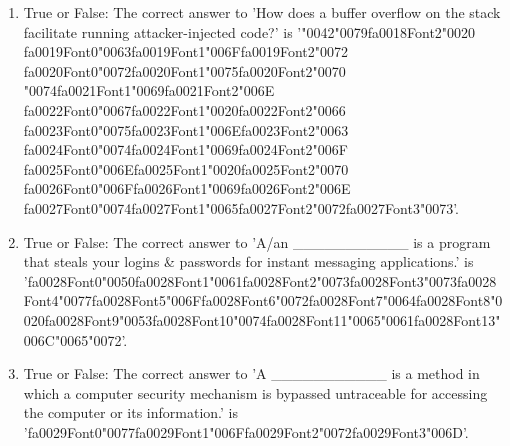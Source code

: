 \documentclass[12pt]{article}
\begin{document}
\begin{enumerate}[label=\arabic*.]
\item True or False: The correct answer to 'How does a buffer overflow on the stack facilitate running attacker-injected code?' is '{\char"0042}{\char"0079}{\csname fa0018Font2\endcsname\char"0020} {\csname fa0019Font0\endcsname\char"0063}{\csname fa0019Font1\endcsname\char"006F}{\csname fa0019Font2\endcsname\char"0072} {\csname fa0020Font0\endcsname\char"0072}{\csname fa0020Font1\endcsname\char"0075}{\csname fa0020Font2\endcsname\char"0070} {\char"0074}{\csname fa0021Font1\endcsname\char"0069}{\csname fa0021Font2\endcsname\char"006E} {\csname fa0022Font0\endcsname\char"0067}{\csname fa0022Font1\endcsname\char"0020}{\csname fa0022Font2\endcsname\char"0066} {\csname fa0023Font0\endcsname\char"0075}{\csname fa0023Font1\endcsname\char"006E}{\csname fa0023Font2\endcsname\char"0063} {\csname fa0024Font0\endcsname\char"0074}{\csname fa0024Font1\endcsname\char"0069}{\csname fa0024Font2\endcsname\char"006F} {\csname fa0025Font0\endcsname\char"006E}{\csname fa0025Font1\endcsname\char"0020}{\csname fa0025Font2\endcsname\char"0070} {\csname fa0026Font0\endcsname\char"006F}{\csname fa0026Font1\endcsname\char"0069}{\csname fa0026Font2\endcsname\char"006E} {\csname fa0027Font0\endcsname\char"0074}{\csname fa0027Font1\endcsname\char"0065}{\csname fa0027Font2\endcsname\char"0072}{\csname fa0027Font3\endcsname\char"0073}'.
\item True or False: The correct answer to 'A/an \_\_\_\_\_\_\_\_\_\_\_ is a program that steals your logins \& passwords for instant messaging applications.' is '{\csname fa0028Font0\endcsname\char"0050}{\csname fa0028Font1\endcsname\char"0061}{\csname fa0028Font2\endcsname\char"0073}{\csname fa0028Font3\endcsname\char"0073}{\csname fa0028Font4\endcsname\char"0077}{\csname fa0028Font5\endcsname\char"006F}{\csname fa0028Font6\endcsname\char"0072}{\csname fa0028Font7\endcsname\char"0064}{\csname fa0028Font8\endcsname\char"0020}{\csname fa0028Font9\endcsname\char"0053}{\csname fa0028Font10\endcsname\char"0074}{\csname fa0028Font11\endcsname\char"0065}{\char"0061}{\csname fa0028Font13\endcsname\char"006C}{\char"0065}{\char"0072}'.
\item True or False: The correct answer to 'A \_\_\_\_\_\_\_\_\_\_\_ is a method in which a computer security mechanism is bypassed untraceable for accessing the computer or its information.' is '{\csname fa0029Font0\endcsname\char"0077}{\csname fa0029Font1\endcsname\char"006F}{\csname fa0029Font2\endcsname\char"0072}{\csname fa0029Font3\endcsname\char"006D}'.

\end{enumerate}
\end{document}
